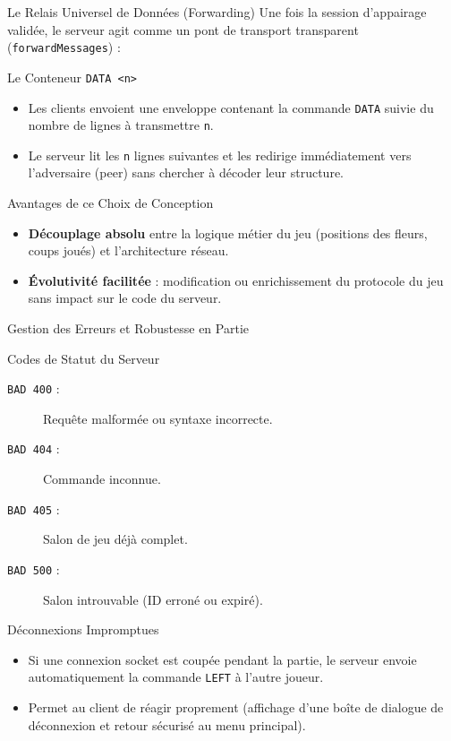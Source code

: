\documentclass{beamer}
\begin{document}
\begin{frame}{Le Relais Universel de Données (Forwarding)}
    Une fois la session d'appairage validée, le serveur agit comme un pont de transport transparent (\texttt{forwardMessages}) :
    \begin{block}{Le Conteneur \texttt{DATA <n>}}
        \begin{itemize}
            \item Les clients envoient une enveloppe contenant la commande \texttt{DATA} suivie du nombre de lignes à transmettre \texttt{n}.
            \item Le serveur lit les \texttt{n} lignes suivantes et les redirige immédiatement vers l'adversaire (peer) sans chercher à décoder leur structure.
        \end{itemize}
    \end{block}
    \begin{block}{Avantages de ce Choix de Conception}
        \begin{itemize}
            \item \textbf{Découplage absolu} entre la logique métier du jeu (positions des fleurs, coups joués) et l'architecture réseau.
            \item \textbf{Évolutivité facilitée} : modification ou enrichissement du protocole du jeu sans impact sur le code du serveur.
        \end{itemize}
    \end{block}
\end{frame}

\begin{frame}{Gestion des Erreurs et Robustesse en Partie}
    \begin{block}{Codes de Statut du Serveur}
        \begin{description}
            \item[\texttt{BAD 400} :] Requête malformée ou syntaxe incorrecte.
            \item[\texttt{BAD 404} :] Commande inconnue.
            \item[\texttt{BAD 405} :] Salon de jeu déjà complet.
            \item[\texttt{BAD 500} :] Salon introuvable (ID erroné ou expiré).
        \end{description}
    \end{block}
    \begin{block}{Déconnexions Impromptues}
        \begin{itemize}
            \item Si une connexion socket est coupée pendant la partie, le serveur envoie automatiquement la commande \texttt{LEFT} à l'autre joueur.
            \item Permet au client de réagir proprement (affichage d'une boîte de dialogue de déconnexion et retour sécurisé au menu principal).
        \end{itemize}
    \end{block}
\end{frame}
\end{document}
